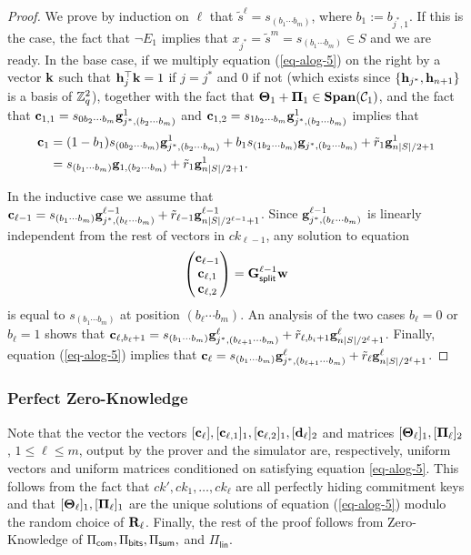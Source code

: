 \begin{proof}
We prove by induction on $\ell$ that $\tilde{s}^\ell=s_{(b_1\cdots b_m)}$, where $b_1:=b_{j^*,1}$. If this is the case, the fact that $\neg E_1$ implies that $x_{j^*}=\tilde{s}^m=s_{(b_1\cdots b_m)}\in S$ and we are ready. In the base case, if we multiply equation (\ref{eq-alog-5}) on the right by a vector $\mathbf{k}$ such that $\mathbf{h}_j^\top\mathbf{k}=1$ if $j=j^*$ and $0$ if not (which exists since $\{\mathbf{h}_{j^*},\mathbf{h}_{n+1}\}$ is a basis of $\mathbb{Z}_q^2$), together with the fact that $\mathbf{{\Theta}}_1+\mathbf{{\Pi}}_1\in\mathbf{Span}(\mathcal{C}_1)$, and the fact that $\mathbf{c}_{1,1}=s_{0b_{2}\cdots b_{m}} \mathbf{g}_{j^*,(b_{2}\cdots b_{m})}^1$ and $\mathbf{c}_{1,2}=s_{1b_{2}\cdots b_{m}}\mathbf{g}_{j^*,(b_{2}\cdots b_{m})}^1$ implies that 
\begin{align*}
\mathbf{c}_1 &= (1-b_{1})s_{(0b_{2}\cdots b_{m})} \mathbf{g}_{j^*,(b_{2}\cdots b_{m})}^1+b_{1}s_{(1b_{2}\cdots b_{m})}\mathbf{g}_{j^*,(b_{2}\cdots b_{m})}+\tilde{r}_1\mathbf{g}_{n|S|/2+1}^1\\
&=s_{(b_{1}\cdots b_{m})}\mathbf{g}_{1,(b_{2}\cdots b_{m})}+\tilde{r}_1\mathbf{g}_{n|S|/2+1}^1.
\end{align*}

In the inductive case we assume that $\mathbf{c}_{\ell-1}=s_{(b_1\cdots b_m)}\mathbf{g}_{j^*,(b_\ell\cdots b_m)}^{\ell-1}+\tilde{r}_{\ell-1}\mathbf{g}_{n|S|/2^{\ell-1}+1}^{\ell-1}$. Since $\mathbf{g}_{j^*,(b_\ell\cdots b_m)}^{\ell-1}$ is linearly independent from the rest of vectors in $ck_{\ell-1}$, any solution to equation
$$
\begin{pmatrix}\mathbf{c}_{\ell-1}\\\mathbf{c}_{\ell,1}\\\mathbf{c}_{\ell,2}\end{pmatrix}=\mathbf{{G}}^{\ell-1}_{\mathsf{split}}\mathbf{w}
$$
 is equal to $s_{(b_1\cdots b_m)}$ at position $(b_\ell \cdots b_m)$. An analysis of the two cases $b_\ell=0$ or $b_\ell=1$ shows that $\mathbf{c}_{\ell,b_\ell+1}=s_{(b_1\cdots b_m)}\mathbf{g}_{j^*,(b_{\ell+1}\cdots b_m)}^\ell+\tilde{r}_{\ell,b_i+1}\mathbf{g}_{n|S|/2^\ell+1}^\ell$. Finally, equation (\ref{eq-alog-5}) implies that $\mathbf{c}_\ell=s_{(b_1\cdots b_m)}\mathbf{g}_{j^*,(b_{\ell+1}\cdots b_m)}^\ell+\tilde{r}_\ell\mathbf{g}_{n|S|/2^\ell+1}^\ell$.
\end{proof}

\subsubsection{Perfect Zero-Knowledge}
Note that the vector the vectors $[\mathbf{c}_\ell],[\mathbf{c}_{\ell,1}]_1,[\mathbf{c}_{\ell,2}]_1,[\mathbf{d}_\ell]_2$ and matrices $[\mathbf{{\Theta}}_\ell]_1,[\mathbf{{\Pi}}_\ell]_2$, $1\leq\ell\leq m$, output by the prover and the simulator are, respectively, uniform vectors and uniform matrices conditioned on satisfying equation \ref{eq-alog-5}. This follows from the fact that $ck',ck_1,\ldots,ck_\ell$ are all perfectly hiding commitment keys and that $[\mathbf{{\Theta}}_\ell]_1,[\mathbf{{\Pi}}_\ell]_1$ are the unique solutions of equation (\ref{eq-alog-5}) modulo the random choice of $\mathbf{{R}}_\ell$. Finally, the rest of the proof follows from Zero-Knowledge of $\Pi_{\mathsf{com}},\Pi_{\mathsf{bits}},\Pi_{\mathsf{sum}},$ and $\Pi_\mathsf{lin}$.

